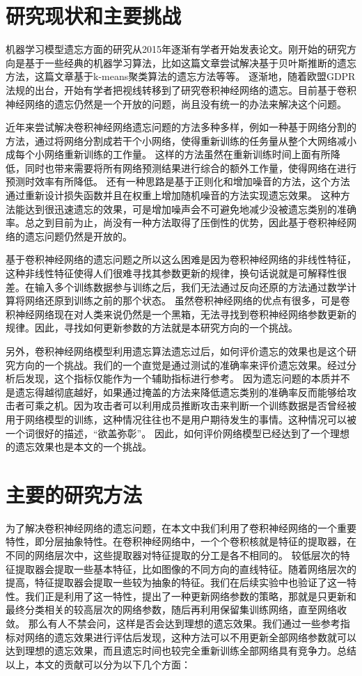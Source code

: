 \section{研究现状和主要挑战}
机器学习模型遗忘方面的研究从2015年逐渐有学者开始发表论文。刚开始的研究方向是基于一些经典的机器学习算法，比如这篇文章\cite{yinzhicao2015}尝试解决基于贝叶斯推断的遗忘方法，这篇文章\cite{antonio2019}基于k-means聚类算法的遗忘方法等等。
逐渐地，随着欧盟GDPR法规的出台，开始有学者把视线转移到了研究卷积神经网络的遗忘。目前基于卷积神经网络的遗忘仍然是一个开放的问题，尚且没有统一的办法来解决这个问题。

近年来尝试解决卷积神经网络遗忘问题的方法多种多样，例如一种基于网络分割的方法\cite{2019arXiv191203817B}，通过将网络分割成若干个小网络，使得重新训练的任务量从整个大网络减小成每个小网络重新训练的工作量。
这样的方法虽然在重新训练时间上面有所降低，同时也带来需要将所有网络预测结果进行综合的额外工作量，使得网络在进行预测时效率有所降低。
还有一种思路是基于正则化和增加噪音的方法，这个方法\cite{Golatkar_2020_CVPR}通过重新设计损失函数并且在权重上增加随机噪音的方法实现遗忘效果。
这种方法能达到很迅速遗忘的效果，可是增加噪声会不可避免地减少没被遗忘类别的准确率。总之到目前为止，尚没有一种方法取得了压倒性的优势，因此基于卷积神经网络的遗忘问题仍然是开放的。

基于卷积神经网络的遗忘问题之所以这么困难是因为卷积神经网络的非线性特征，这种非线性特征使得人们很难寻找其参数更新的规律，换句话说就是可解释性很差。在输入多个训练数据参与训练之后，我们无法通过反向还原的方法通过数学计算将网络还原到训练之前的那个状态。
虽然卷积神经网络的优点有很多，可是卷积神经网络现在对人类来说仍然是一个黑箱，无法寻找到卷积神经网络参数更新的规律。因此，寻找如何更新参数的方法就是本研究方向的一个挑战。

另外，卷积神经网络模型利用遗忘算法遗忘过后，如何评价遗忘的效果也是这个研究方向的一个挑战。我们的一个直觉是通过测试的准确率来评价遗忘效果。经过分析后发现，这个指标仅能作为一个辅助指标进行参考。
因为遗忘问题的本质并不是遗忘得越彻底越好，如果通过掩盖的方法来降低遗忘类别的准确率反而能够给攻击者可乘之机。因为攻击者可以利用成员推断攻击来判断一个训练数据是否曾经被用于网络模型的训练，这种情况往往也不是用户期待发生的事情。这种情况可以被一个词很好的描述，“欲盖弥彰”。
因此，如何评价网络模型已经达到了一个理想的遗忘效果也是本文的一个挑战。

\section{主要的研究方法}
为了解决卷积神经网络的遗忘问题，在本文中我们利用了卷积神经网络的一个重要特性，即分层抽象特性。在卷积神经网络中，一个个卷积核就是特征的提取器，在不同的网络层次中，这些提取器对特征提取的分工是各不相同的。
较低层次的特征提取器会提取一些基本特征，比如图像的不同方向的直线特征。随着网络层次的提高，特征提取器会提取一些较为抽象的特征。我们在后续实验中也验证了这一特性。我们正是利用了这一特性，提出了一种更新网络参数的策略，那就是只更新和最终分类相关的较高层次的网络参数，随后再利用保留集训练网络，直至网络收敛。
那么有人不禁会问，这样是否会达到理想的遗忘效果。我们通过一些参考指标对网络的遗忘效果进行评估后发现，这种方法可以不用更新全部网络参数就可以达到理想的遗忘效果，而且遗忘时间也较完全重新训练全部网络具有竞争力。总结以上，本文的贡献可以分为以下几个方面：

